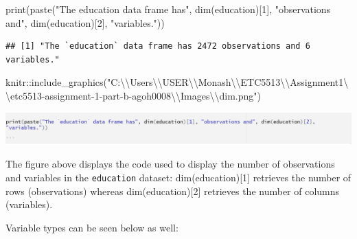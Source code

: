 \documentclass[
]{article}
\newenvironment{Shaded}{\begin{snugshade}}{\end{snugshade}}
\newcommand{\DecValTok}[1]{\textcolor[rgb]{0.00,0.00,0.81}{#1}}
\newcommand{\FunctionTok}[1]{\textcolor[rgb]{0.00,0.00,0.00}{#1}}
\newcommand{\NormalTok}[1]{#1}
\newcommand{\SpecialCharTok}[1]{\textcolor[rgb]{0.00,0.00,0.00}{#1}}
\newcommand{\StringTok}[1]{\textcolor[rgb]{0.31,0.60,0.02}{#1}}
\begin{document}
\begin{Shaded}
\begin{Highlighting}[]
\FunctionTok{print}\NormalTok{(}\FunctionTok{paste}\NormalTok{(}\StringTok{"The \textasciigrave{}education\textasciigrave{} data frame has"}\NormalTok{, }\FunctionTok{dim}\NormalTok{(education)[}\DecValTok{1}\NormalTok{], }\StringTok{"observations and"}\NormalTok{, }\FunctionTok{dim}\NormalTok{(education)[}\DecValTok{2}\NormalTok{], }\StringTok{"variables."}\NormalTok{))}
\end{Highlighting}
\end{Shaded}

\begin{verbatim}
## [1] "The `education` data frame has 2472 observations and 6 variables."
\end{verbatim}

\begin{Shaded}
\begin{Highlighting}[]
\NormalTok{knitr}\SpecialCharTok{::}\FunctionTok{include\_graphics}\NormalTok{(}\StringTok{"C:}\SpecialCharTok{\textbackslash{}\textbackslash{}}\StringTok{Users}\SpecialCharTok{\textbackslash{}\textbackslash{}}\StringTok{USER}\SpecialCharTok{\textbackslash{}\textbackslash{}}\StringTok{Monash}\SpecialCharTok{\textbackslash{}\textbackslash{}}\StringTok{ETC5513}\SpecialCharTok{\textbackslash{}\textbackslash{}}\StringTok{Assignment1}\SpecialCharTok{\textbackslash{}\textbackslash{}}\StringTok{etc5513{-}assignment{-}1{-}part{-}b{-}agoh0008}\SpecialCharTok{\textbackslash{}\textbackslash{}}\StringTok{Images}\SpecialCharTok{\textbackslash{}\textbackslash{}}\StringTok{dim.png"}\NormalTok{)}
\end{Highlighting}
\end{Shaded}

\begin{center}\includegraphics[width=25.71in]{Images/dim} \end{center}

The figure above displays the code used to display the number of observations and variables in the \texttt{education} dataset: dim(education){[}1{]} retrieves the number of rows (observations) whereas dim(education){[}2{]} retrieves the number of columns (variables).

Variable types can be seen below as well:
\end{document}
